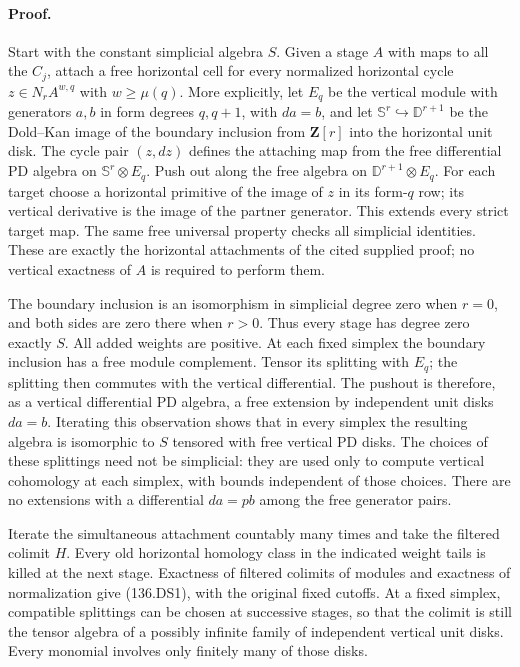 \paragraph{Proof.}
Start with the constant simplicial algebra $S$.  Given a stage
$A$ with maps to all the $C_j$, attach a free horizontal cell for
every normalized horizontal cycle $z\in N_r A^{w,q}$ with
$w\geq\mu(q)$.  More explicitly, let $E_q$ be the vertical module
with generators $a,b$ in form degrees $q,q+1$, with $da=b$, and
let $\mathbb S^r\hookrightarrow\mathbb D^{r+1}$ be the Dold--Kan
image of the boundary inclusion from $\mathbf Z[r]$ into the
horizontal unit disk.  The cycle pair $(z,dz)$ defines the attaching
map from the free differential PD algebra on
$\mathbb S^r\otimes E_q$.  Push out along the free algebra on
$\mathbb D^{r+1}\otimes E_q$.
For each target choose a horizontal primitive of the image of $z$
in its form-$q$ row; its vertical derivative is the image of the
partner generator.  This extends every strict target map.  The
same free universal property checks all simplicial identities.
These are exactly the horizontal attachments of the cited supplied
proof; no vertical exactness of $A$ is required to perform them.

The boundary inclusion is an isomorphism in simplicial degree zero
when $r=0$, and both sides are zero there when $r>0$.  Thus every
stage has degree zero exactly $S$.  All added weights are positive.
At each fixed simplex the boundary inclusion has a free module
complement.  Tensor its splitting with $E_q$; the splitting then
commutes with the vertical differential.  The pushout is therefore,
as a vertical differential PD algebra, a free extension by
independent unit disks $da=b$.  Iterating this observation shows
that in every simplex the resulting algebra is isomorphic to
$S$ tensored with free vertical PD disks.  The choices of these
splittings need not be simplicial: they are used only to compute
vertical cohomology at each simplex, with bounds independent of
those choices.  There are no extensions with a differential
$da=p b$ among the free generator pairs.

Iterate the simultaneous attachment countably many times and take
the filtered colimit $H$.  Every old horizontal homology class in
the indicated weight tails is killed at the next stage.  Exactness
of filtered colimits of modules and exactness of normalization give
(136.DS1), with the original fixed cutoffs.  At a fixed simplex,
compatible splittings can be chosen at successive stages, so that
the colimit is still the tensor algebra of a possibly infinite
family of independent vertical unit disks.  Every monomial involves
only finitely many of those disks.

